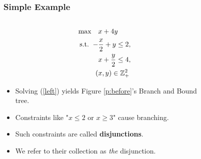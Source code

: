 \documentclass{beamer}
\begin{document}
	\begin{frame}[t]
		\frametitle{Simple Example}
		\footnotesize
		\begin{columns}[T]
			\begin{column}{0.3\textwidth}
				\vspace{-.25cm}
				\begin{align}
					\begin{split}
						\text{max} \quad &x + 4y \\
						\text{s.t.} \; \; -&\frac{x}{2} + y \leq 2, \\
						&x + \frac{y}{2} \leq 4, \\
						(&x, y) \in \mathbb{Z}^2_+
					\end{split}
					\label{left}
				\end{align}
				\begin{itemize}
					\item Solving (\ref{left}) yields Figure \ref{p:before}'s Branch and Bound tree.
					\item Constraints like "$x \leq 2$ or $x \geq 3$" cause branching.
					\item Such constraints are called \textbf{disjunctions}.
					\item We refer to their collection as \textit{the} disjunction.
				\end{itemize}
			\end{column}
			\begin{column}{0.7\textwidth}
				\vspace{-.25cm}
				\begin{figure}[h]
\end{figure}
\end{column}
\end{columns}
\end{frame}
\end{document}
